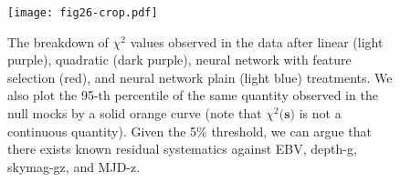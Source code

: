 \begin{figure}
    \centering
    \texttt{[image: fig26-crop.pdf]}
    \caption{ The breakdown of $\chi^{2}$ values observed in the data after linear (light purple), quadratic (dark purple), neural network with feature selection (red), and neural network plain (light blue) treatments. We also plot the 95-th percentile of the same quantity observed in the null mocks by a solid orange curve (note that $\chi^{2}(\textbf{s)}$ is not a continuous quantity). Given the 5\% threshold, we can argue that there exists known residual systematics against EBV, depth-g, skymag-gz, and MJD-z.}
    \label{fig:chi2breakdown}
\end{figure}

